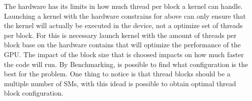 The hardware has its limits in how much thread per block a kernel can handle. Launching a kernel with the hardware constrains for above can only ensure that the kernel will actually be executed in the device, not a optimize set of threads per block. For this is necessary launch kernel with the amount of threads per block base on the hardware contains that will optimize the performance of the GPU. The impact of the block size that is choosed impacts on how much faster the code will run. By Benchmarking, is possible to find what configuration is the best for the problem. One thing to notice is that thread blocks should be a multiple number of SMs, with this idead is possible to obtain optimal thread block configuration.




